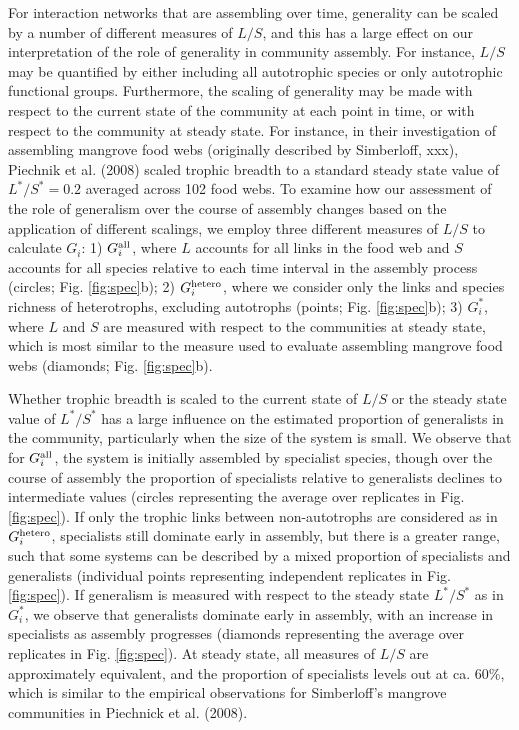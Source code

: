 \documentclass[9pt,twocolumn,twoside]{pnas-new}
\newcommand{\rr}[1]{{\rm #1}}
\begin{document}
For interaction networks that are assembling over time, generality can be scaled by a number of different measures of $L/S$, and this has a large effect on our interpretation of the role of generality in community assembly.
For instance, $L/S$ may be quantified by either including all autotrophic species or only autotrophic functional groups.
Furthermore, the scaling of generality may be made with respect to the current state of the community at each point in time, or with respect to the community at steady state.
For instance, in their investigation of assembling mangrove food webs (originally described by Simberloff, xxx), Piechnik et al. (2008) scaled trophic breadth to a standard steady state value of $L^*/S^* = 0.2$ averaged across 102 food webs.
To examine how our assessment of the role of generalism over the course of assembly changes based on the application of different scalings, we employ three different measures of $L/S$ to calculate $G_i$:
1) $G_i^{\rr{all}}$, where $L$ accounts for all links in the food web and $S$ accounts for all species relative to each time interval in the assembly process (circles; Fig. \ref{fig:spec}b);
2) $G_i^{\rr{hetero}}$, where we consider only the links and species richness of heterotrophs, excluding autotrophs (points; Fig. \ref{fig:spec}b);
3) $G_i^*$, where $L$ and $S$ are measured with respect to the communities at steady state, which is most similar to the measure used to evaluate assembling mangrove food webs (diamonds; Fig. \ref{fig:spec}b).




Whether trophic breadth is scaled to the current state of $L/S$ or the steady state value of $L^*/S^*$ has a large influence on the estimated proportion of generalists in the community, particularly when the size of the system is small.
We observe that for $G_i^{\rr{all}}$, the system is initially assembled by specialist species, though over the course of assembly the proportion of specialists relative to generalists declines to intermediate values (circles representing the average over replicates in Fig. \ref{fig:spec}).
If only the trophic links between non-autotrophs are considered as in $G_i^{\rr{hetero}}$, specialists still dominate early in assembly, but there is a greater range, such that some systems can be described by a mixed proportion of specialists and generalists (individual points representing independent replicates in Fig. \ref{fig:spec}).
If generalism is measured with respect to the steady state $L^*/S^*$ as in $G_i^*$, we observe that generalists dominate early in assembly, with an increase in specialists as assembly progresses (diamonds representing the average over replicates in Fig. \ref{fig:spec}).
At steady state, all measures of $L/S$ are approximately equivalent, and the proportion of specialists levels out at ca. 60\%, which is similar to the empirical observations for Simberloff's mangrove communities in Piechnick et al. (2008).
\end{document}
